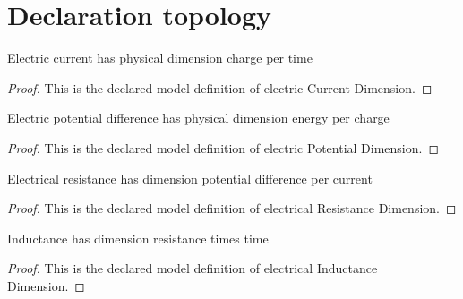 \section{Declaration topology}
\begin{definition}
  \label{def:physics:phyx-mini-0985:phyxminiproblems-problemphyxmini0985-electriccurrentdimension}
  Electric current has physical dimension charge per time
\end{definition}
\begin{proof}
  This is the declared model definition of electric Current Dimension.
\end{proof}
\begin{definition}
  \label{def:physics:phyx-mini-0985:phyxminiproblems-problemphyxmini0985-electricpotentialdimension}
  Electric potential difference has physical dimension energy per charge
\end{definition}
\begin{proof}
  This is the declared model definition of electric Potential Dimension.
\end{proof}
\begin{definition}
  \label{def:physics:phyx-mini-0985:phyxminiproblems-problemphyxmini0985-electricalresistancedimension}
  Electrical resistance has dimension potential difference per current
\end{definition}
\begin{proof}
  This is the declared model definition of electrical Resistance Dimension.
\end{proof}
\begin{definition}
  \label{def:physics:phyx-mini-0985:phyxminiproblems-problemphyxmini0985-electricalinductancedimension}
  Inductance has dimension resistance times time
\end{definition}
\begin{proof}
  This is the declared model definition of electrical Inductance Dimension.
\end{proof}
